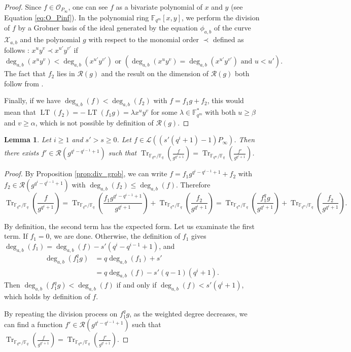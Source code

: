 \documentclass[a4paper]{article}
\newtheorem{lemma}[thm]{Lemma}
\theoremstyle{definition}
\theoremstyle{remark}
\newcommand{\calL}{\mathcal{L}}
\newcommand{\calO}{\mathcal{O}}
\newcommand{\calR}{\mathcal{R}}
\newcommand{\calX}{\mathcal{X}}
\newcommand{\fq}{\mathbb{F}_{q}}
\newcommand{\F}{\mathbb{F}}
\newcommand{\Tr}[1]{\operatorname{Tr}_{\mathbb{F}_{q^m}/\fq}\left(#1\right)}
\newcommand{\LT}[1]{\operatorname{LT}\left(#1\right)}
\newcommand{\degab}[1]{\deg_{a,b}\left(#1\right)}
\begin{document}
\begin{proof}
		Since $f \in \calO_{P_\infty}$, one can see $f$ as a bivariate polynomial of $x$ and $y$ (see Equation \ref{eq:O_Pinf}). In the polynomial ring $\F_{q^m}[x,y]$, we perform the division of $f$ by a Grobner basis of the ideal generated by the equation $\phi_{a,b}$ of the curve $\calX_{a,b}$ and the polynomial $g$ with respect to the monomial order $\prec$ defined as follows : $x^uy^v \prec x^{u'}y^{v'}$ if
	\[ \degab{x^uy^v} < \degab{x^{u'}y^{v'}} \text{ or } \left(\degab{x^uy^v} = \degab{x^{u'}y^{v'}}  \text{ and } u < u'\right).\]
	The fact that $f_2$ lies in $\calR(g)$ and the result on the dimension of $\calR(g)$ both follow from \cite[Proposition 4]{GH00}.
	
	Finally, if we have $\degab{f} < \degab{f_2}$ with $f=f_1 g +f_2$, this would mean that $\LT{f_2}=-\LT{f_1 g}=\lambda x^uy^v$ for some $\lambda \in \F_{q^m}^*$ with both $u \geq \beta$ and $v \geq \alpha$, which is not possible by definition of $\calR\left(g\right)$.
\end{proof}


\begin{lemma} \label{lem:weighted_division}
	Let $i \geq 1$ and $s'>s \geq 0$. Let $f \in \calL\left(\left(s'(q^i+1)-1\right)P_\infty\right)$. Then there exists $f' \in \calR\left(g^{q^i-q^{i-1}+1}\right)$ such that $\Tr{\frac{f}{g^{q^i+1}}} = \Tr{\frac{f'}{g^{q^i+1}}} $.
\end{lemma}

\begin{proof}

By Proposition \ref{prop:div_grob}, we can write $f=f_1 g^{q^i-q^{i-1}+1} +f_2$ with
	$f_2 \in \calR\left(g^{q^i-q^{i-1}+1}\right)$ with $\degab{f_2} \leq \degab{f}$. Therefore
	\[\Tr{\frac{f}{g^{q^i+1}}}=\Tr{\frac{f_1 g^{q^i-q^{i-1}+1}}{g^{q^i+1}}} +\Tr{\frac{f_2}{g^{q^i+1}}}= \Tr{\frac{f_1^qg}{g^{q^i+1}}} +\Tr{\frac{f_2}{g^{q^i+1}}}. \]
	
	By definition, the second term has the expected form. Let us examinate the first term. If $f_1=0$, we are done. Otherwise, the definition of $f_1$ gives
$\degab{f_1} =\degab{f} - s'(q^i-q^{i-1}+1)$, and
	\begin{align*}
	\degab{f_1^qg} 	&= q \degab{f_1} + s'\\
					&= q\degab{f} - s'(q-1)(q^i+1).
	\end{align*} 
Then  $\degab{f_1^qg} < \degab{f}$ if and only if $\degab{f} < s'(q^i+1)$, which holds by definition of $f$.

By repeating the division process on $f_1^qg$, as the weighted degree decreases, we can find a function $f' \in \calR\left(g^{q^i-q^{i-1}+1}\right)$ such that $\Tr{\frac{f}{g^{q^i+1}}} = \Tr{\frac{f'}{g^{q^i+1}}} $.

\end{proof}
\end{document}
